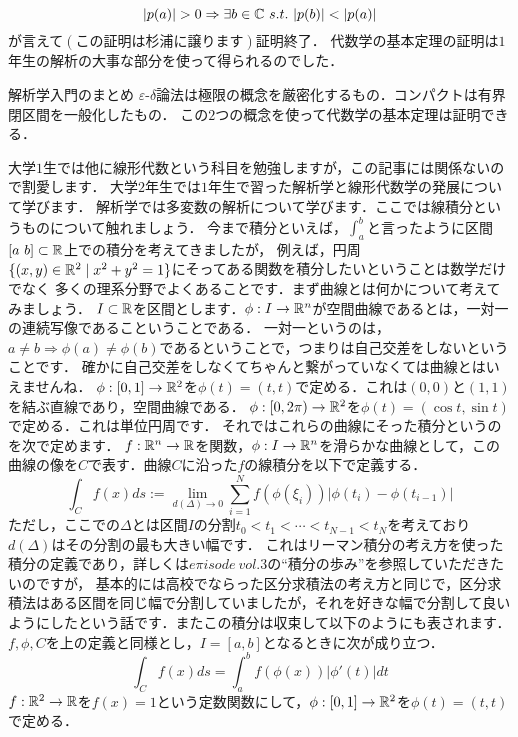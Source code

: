 \[
|p(a)|>0 \Rightarrow \exists b \in \C \ s.t. \ |p(b)| < |p(a)|
\]
が言えて$(この証明は杉浦に譲ります)$証明終了．
\proofx
代数学の基本定理の証明は$1$年生の解析の大事な部分を使って得られるのでした．
\begin{itembox}[l]{解析学入門のまとめ}
$\varepsilon$-$\delta$論法は極限の概念を厳密化するもの．コンパクトは有界閉区間を一般化したもの．
この$2$つの概念を使って代数学の基本定理は証明できる．
\end{itembox}
大学$1$生では他に線形代数という科目を勉強しますが，この記事には関係ないので割愛します．
大学$2$年生では$1$年生で習った解析学と線形代数学の発展について学びます．
解析学では多変数の解析について学びます．ここでは線積分というものについて触れましょう．
今まで積分といえば，$\int_a^b$と言ったように区間$[a\ b]\subset \mathbb R$上での積分を考えてきましたが，
例えば，円周$\{(x,y)\in\mathbb R^2 \mid x^2+y^2=1\}$にそってある関数を積分したいということは数学だけでなく
多くの理系分野でよくあることです．まず曲線とは何かについて考えてみましょう．
$I\subset\mathbb R$を区間とします．$\phi:I \to \mathbb R^n$が空間曲線であるとは，一対一の連続写像であるこということである．
一対一というのは，$a\neq b \Rightarrow \phi(a) \neq \phi(b)$であるということで，つまりは自己交差をしないということです．
確かに自己交差をしなくてちゃんと繋がっていなくては曲線とはいえませんね．
\ex
$\phi:[0,1] \to \mathbb R^2$を$\phi(t)=(t,t)$で定める．これは$(0,0)$と$(1,1)$を結ぶ直線であり，空間曲線である．
\exx
\ex
$\phi:[0,2\pi) \to \mathbb R^2$を$\phi(t)=(\cos t ,\sin t)$で定める．これは単位円周です．
\exx
それではこれらの曲線にそった積分というのを次で定めます．
$f:\mathbb R^n \to \mathbb R$を関数，$\phi:I\to\mathbb R^n$を滑らかな曲線として，この曲線の像を$C$で表す．曲線$C$に沿った$f$の線積分を以下で定義する．
\[
\int_C f(x)ds := \lim_{d(\Delta)\to 0} \sum_{i=1}^N f(\phi(\xi_i)) |\phi(t_i) - \phi(t_{i-1})|
\]
ただし，ここでの$\Delta$とは区間$I$の分割$t_0 < t_1 < \cdots < t_{N-1} < t_N$を考えており$d(\Delta)$はその分割の最も大きい幅です．
これはリーマン積分の考え方を使った積分の定義であり，詳しくは$e\pi isode\ vol.3$の``積分の歩み''を参照していただきたいのですが，
基本的には高校でならった区分求積法の考え方と同じで，区分求積法はある区間を同じ幅で分割していましたが，それを好きな幅で分割して良いようにしたという話です．またこの積分は収束して以下のようにも表されます．
\prop
$f,\phi,C$を上の定義と同様とし，$I=[a,b]$となるときに次が成り立つ．
\[
\int_C f(x) ds = \int_a^b f(\phi(x))|\phi'(t)|dt
\]
\propx
\ex
$f:\mathbb R^2\to\mathbb R$を$f(x)=1$という定数関数にして，$\phi:[0,1] \to \mathbb R^2$を$\phi(t)=(t,t)$で定める．\\
